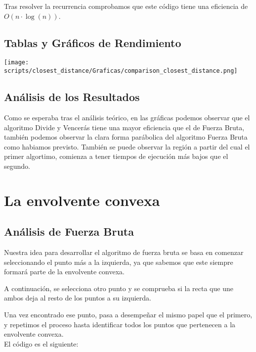 \documentclass[a4paper,12pt]{article}
\begin{document}
Tras resolver la recurrencia comprobamos que este código tiene una eficiencia de $O(n\cdot \log (n))$.\\

\subsection{Tablas y Gráficos de Rendimiento}

\begin{center}
	\texttt{[image: scripts/closest\_distance/Graficas/comparison\_closest\_distance.png]}
\end{center}


\subsection{Análisis de los Resultados}
Como se esperaba tras el análisis teórico, en las gráficas podemos observar que el algoritmo Divide y Vencerás 
tiene una mayor eficiencia que el de Fuerza Bruta, también podemos observar la clara forma parábolica del algoritmo
Fuerza Bruta como habiamos previsto. También se puede observar la región a partir del cual el primer algortimo, comienza 
a tener tiempos de ejecución más bajos que el segundo.


\section{La envolvente convexa}
\subsection{Análisis de Fuerza Bruta}

Nuestra idea para desarrollar el algoritmo de fuerza bruta se basa en comenzar seleccionando 
el punto más a la izquierda, ya que sabemos que este siempre formará parte de la envolvente convexa. 

A continuación, se selecciona otro punto y se comprueba si la recta que une ambos deja al resto de los puntos 
a su izquierda. 

Una vez encontrado ese punto, pasa a desempeñar el mismo papel que el primero, y repetimos el proceso 
hasta identificar todos los puntos que pertenecen a la envolvente convexa.\\

El código es el siguiente:
\end{document}
